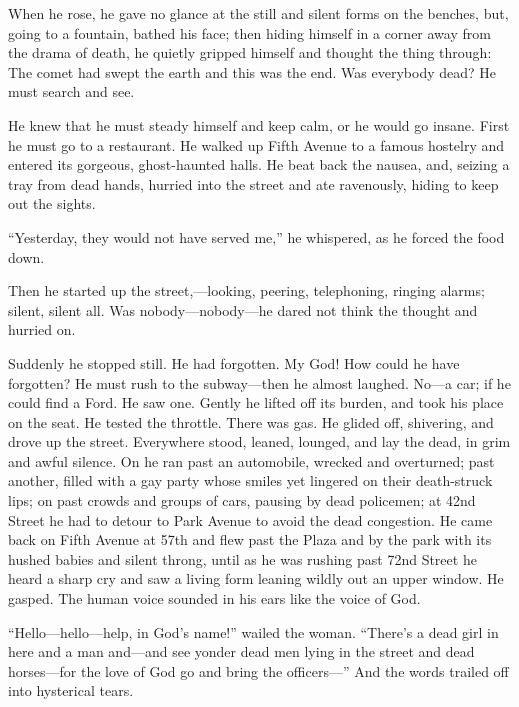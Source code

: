 When he rose, he gave no glance at the still and silent forms on
the benches, but, going to a fountain, bathed his face; then
hiding himself in a corner away from the drama of death, he
quietly gripped himself and thought the thing through: The comet
had swept the earth and this was the end. Was everybody dead? He
must search and see.

He knew that he must steady himself and keep calm, or he would
go insane. First he must go to a restaurant. He walked up Fifth
Avenue to a famous hostelry and entered its gorgeous,
ghost-haunted halls. He beat back the nausea, and, seizing a
tray from dead hands, hurried into the street and ate
ravenously, hiding to keep out the sights.

``Yesterday, they would not have served me,'' he whispered, as he
forced the food down.

Then he started up the street,---looking, peering, telephoning,
ringing alarms; silent, silent all. Was nobody---nobody---he dared
not think the thought and hurried on.

Suddenly he stopped still. He had forgotten. My God! How could
he have forgotten? He must rush to the subway---then he almost
laughed. No---a car; if he could find a Ford. He saw
one. Gently he lifted off its burden, and took his place on
the seat. He tested the throttle. There was gas. He glided
off, shivering, and drove up the street. Everywhere stood,
leaned, lounged, and lay the dead, in grim and awful
silence. On he ran past an automobile, wrecked and overturned;
past another, filled with a gay party whose smiles yet
lingered on their death-struck lips; on past crowds and groups
of cars, pausing by dead policemen; at 42nd Street he had to
detour to Park Avenue to avoid the dead congestion. He came
back on Fifth Avenue at 57th and flew past the Plaza and by
the park with its hushed babies and silent throng, until as he
was rushing past 72nd Street he heard a sharp cry and saw a
living form leaning wildly out an upper window. He gasped. The
human voice sounded in his ears like the voice of God.

``Hello---hello---help, in God's name!'' wailed the woman. ``There's a
dead girl in here and a man and---and see yonder dead men lying in
the street and dead horses---for the love of God go and bring the
officers---'' And the words trailed off into hysterical tears.

